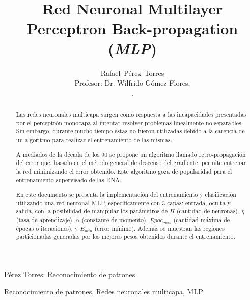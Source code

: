 \documentclass[journal]{IEEEtran}
\begin{document}

\title{Red Neuronal Multilayer Perceptron Back-propagation (\emph{MLP})}

\author{Rafael~Pérez~Torres \\
	Profesor: Dr. Wilfrido Gómez Flores,\\[6pt].
	
}

%
{Pérez Torres: Reconocimiento de patrones}

\maketitle

\begin{abstract}
Las redes neuronales multicapa surgen como respuesta a las incapacidades presentadas por el perceptrón monocapa al intentar resolver problemas linealmente no separables.
Sin embargo, durante mucho tiempo éstas no fueron utilizadas debido a la carencia de un algoritmo para realizar el entrenamiento de las mismas.

A mediados de la década de los 90 se propone un algoritmo llamado retro-propagación del error que, basado en el método general de descenso del gradiente, permite entrenar la red minimizando el error obtenido.
Este algoritmo goza de popularidad para el entrenamiento supervisado de las RNA.

En este documento se presenta la implementación del entrenamiento y clasificación utilizando una red neuronal MLP, específicamente con 3 capas: entrada, oculta y salida, con la posibilidad de manipular los parámetros de $H$ (cantidad de neuronas), $\eta$ (tasa de aprendizaje), $\alpha$ (constante de momento), $Epoc_{max}$ (cantidad máxima de épocas o iteraciones), y $E_{min}$ (error mínimo).
Además se muestran las regiones particionadas generadas por los mejores pesos obtenidos durante el entrenamiento.
\end{abstract}

\begin{IEEEkeywords}
Reconocimiento de patrones, Redes neuronales multicapa, MLP
\end{IEEEkeywords}
\end{document}
